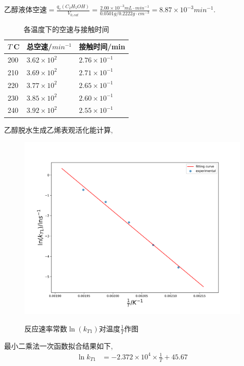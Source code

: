 \documentclass[a4paper]{article}
\begin{document}
\begin{enumerate}
乙醇液体空速$=\frac{q_{v}(C_{2}H_{5}OH)}{V_{0, cat}} = 
\frac{2.00\times10^{-3}mL\cdot min^{-1}}{0.0501g/0.2222g\cdot cm^{-3}} = 8.87\times10^{-3}min^{-1}$.
\begin{table}[H]
	\begin{center}
		\caption{各温度下的空速与接触时间}
		\begin{tabular}{l|l|l}
		\hline
		$T^\cdot$C &总空速/$min^{-1}$&接触时间/min\\
		\hline
		200		&$3.62\times 10^{2}$	&$2.76\times 10^{-1}$\\
		\hline
		210 	&$3.69\times 10^{2}$	&$2.71\times 10^{-1}$\\
		\hline
		220 	&$3.77\times 10^{2}$	&$2.65\times 10^{-1}$\\
		\hline
		230 	&$3.85\times 10^{2}$	&$2.60\times 10^{-1}$\\
		\hline
		240 	&$3.92\times 10^{2}$	&$2.55\times 10^{-1}$\\
		\hline
		\end{tabular}
	\end{center}
\end{table}
乙醇脱水生成乙烯表观活化能计算,
\begin{figure}[H]
	\centering
	\includegraphics[width=0.50\paperwidth]{fig/kT1.png}\\
	\caption{反应速率常数$\ln(k_{T1})$对温度$\frac{1}{T}$作图}
\end{figure}
最小二乘法一次函数拟合结果如下,
\begin{equation}
	\begin{aligned}
		\ln k_{T1} &= -2.372\times 10^{4} \times \frac{1}{T} + 45.67\\

\end{aligned}
\end{equation}
\end{enumerate}
\end{document}
